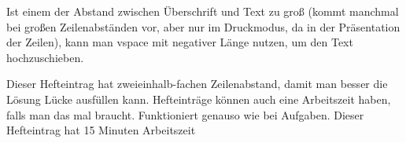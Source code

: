 {
    \ifbeamer\else\vspace{-0.6cm}\fi
    
    Ist einem der Abstand zwischen Überschrift und Text zu groß (kommt manchmal bei großen Zeilenabständen vor, aber nur im Druckmodus, da in der Präsentation der Zeilen), kann man vspace mit negativer Länge nutzen, um den Text hochzuschieben.

    Dieser Hefteintrag hat zweieinhalb-fachen Zeilenabstand, damit man besser die Lösung Lücke ausfüllen kann. Hefteinträge können auch eine Arbeitszeit haben, falls man das mal braucht. Funktioniert genauso wie bei Aufgaben. Dieser Hefteintrag hat 15 Minuten Arbeitszeit
}
